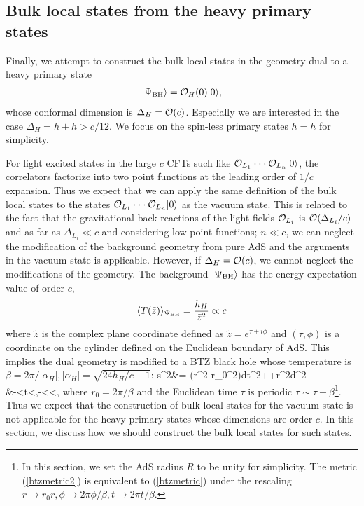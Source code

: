\documentclass[11pt,a4paper]{article}
\def\a{{\alpha}}
\def\s{\sqrt}
\def\CO{{\cal O}}
\def\ba{\begin{eqnarray}}
\def\ea{\end{eqnarray}}
\def\bal#1\eal{\begin{align}#1\end{align}}
\def\r{\rightarrow}
\def\f {\frac}
\def\ddd{\cdot\cdot\cdot}
\def\no{\nonumber \\}
\def\la{\langle}
\def\lb{\rangle}
\def\r{\rightarrow}
\begin{document}
\subsection{Bulk local states from the heavy primary states}\label{Hea}
Finally, we attempt to construct the bulk local states in the geometry dual to a heavy primary state
\ba
|\Psi_{\rm BH}\lb=\CO_{H}(0)|0\lb,
\ea
whose conformal dimension is $\Delta_H=\CO(c)$. Especially we are interested in the case $\Delta_H=h+\bar{h}>c/12$. We focus on the spin-less primary states $h=\bar{h}$ for simplicity.


For light excited states in the large $c$ CFTs such like $\CO_{L_1}\ddd \CO_{L_n}|0\lb$, the correlators factorize into two point functions at the leading order of $1/c$ expansion. Thus we expect that we can apply the same definition of the bulk local states to the states $\CO_{L_1}\ddd \CO_{L_n}|0\lb$ as the vacuum state. This is related to the fact that the gravitational back reactions of the light fields $\CO_{L_i}$ is $\CO(\Delta_{L_i}/c)$ and as far as $\Delta_{L_i}\ll c$ and considering low point functions; $n\ll c$, we can neglect the modification of the background geometry from pure AdS and the arguments in the vacuum state is applicable.
However, if $\Delta_{H}= \CO(c)$, we cannot neglect the modifications of the geometry. The background $|\Psi_{\rm BH}\lb$ has the energy expectation value of order $c$,
\ba
\la T(\tilde{z})\lb_{\Psi_{\rm BH}}=\f{h_H}{\tilde{z}^2}\propto c
\ea
where $\tilde{z}$ is the complex plane coordinate defined as $\tilde{z}=e^{\tau+i\phi}$ and $(\tau,\phi)$ is a coordinate on the cylinder defined on the Euclidean boundary of AdS.
This implies the dual geometry is modified to a BTZ black hole whose temperature is $\beta=2\pi/|\a_H|, |\a_H|=\s{24h_H/c-1}$\cite{Bana}:
\bal
ds^{2}&=-(r^{2}-r_0^2)dt^{2}+\f{dr^{2}}{r^{2}-r_0^2}+r^{2}d\phi^{2}\no
&-\infty<t<\infty,-\pi<\phi<\pi,\label{btzmetric2}
 \eal
where $r_0=2\pi/\beta$ and the Euclidean time $\tau$ is periodic $\tau\sim \tau+\beta$\footnote{In this section, we set the AdS radius $R$ to be unity for simplicity. The metric (\ref{btzmetric2}) is equivalent to (\ref{btzmetric}) under the rescaling $r\r r_0 r,\phi\r 2\pi \phi/\beta, t\r 2\pi t/\beta$. }. Thus we expect that the construction of bulk local states for the vacuum state is not applicable for the heavy primary states whose dimensions are order $c$. In this section, we discuss how we should construct the bulk local states for such states.
\end{document}
